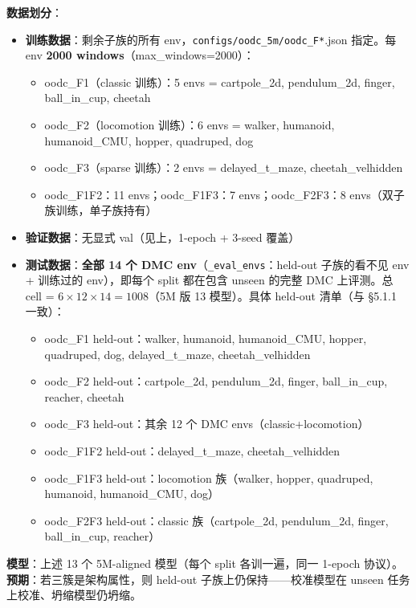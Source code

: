 \documentclass[11pt,a4paper]{article}
\begin{document}
\textbf{数据划分}：
\begin{itemize}[leftmargin=2em]
    \item \textbf{训练数据}：剩余子族的所有 env，\texttt{configs/oodc\_5m/oodc\_F*}.json 指定。每 env \textbf{2000 windows}（max\_windows=2000）：
    \begin{itemize}
        \item oodc\_F1（classic 训练）：5 envs = cartpole\_2d, pendulum\_2d, finger, ball\_in\_cup, cheetah
        \item oodc\_F2（locomotion 训练）：6 envs = walker, humanoid, humanoid\_CMU, hopper, quadruped, dog
        \item oodc\_F3（sparse 训练）：2 envs = delayed\_t\_maze, cheetah\_velhidden
        \item oodc\_F1F2：11 envs；oodc\_F1F3：7 envs；oodc\_F2F3：8 envs（双子族训练，单子族持有）
    \end{itemize}
    \item \textbf{验证数据}：无显式 val（见上，1-epoch + 3-seed 覆盖）
    \item \textbf{测试数据}：\textbf{全部 14 个 DMC env}（\texttt{\_eval\_envs}：held-out 子族的看不见 env + 训练过的 env），即每个 split 都在包含 unseen 的完整 DMC 上评测。总 cell = $6 \times 12 \times 14 = 1008$（5M 版 13 模型）。具体 held-out 清单（与 §5.1.1 一致）：
    \begin{itemize}
        \item oodc\_F1 held-out：walker, humanoid, humanoid\_CMU, hopper, quadruped, dog, delayed\_t\_maze, cheetah\_velhidden
        \item oodc\_F2 held-out：cartpole\_2d, pendulum\_2d, finger, ball\_in\_cup, reacher, cheetah
        \item oodc\_F3 held-out：其余 12 个 DMC envs（classic+locomotion）
        \item oodc\_F1F2 held-out：delayed\_t\_maze, cheetah\_velhidden
        \item oodc\_F1F3 held-out：locomotion 族（walker, hopper, quadruped, humanoid, humanoid\_CMU, dog）
        \item oodc\_F2F3 held-out：classic 族（cartpole\_2d, pendulum\_2d, finger, ball\_in\_cup, reacher）
    \end{itemize}
\end{itemize}

\textbf{模型}：上述 13 个 5M-aligned 模型（每个 split 各训一遍，同一 1-epoch 协议）。\textbf{预期}：若三簇是架构属性，则 held-out 子族上仍保持——校准模型在 unseen 任务上校准、坍缩模型仍坍缩。
\end{document}
